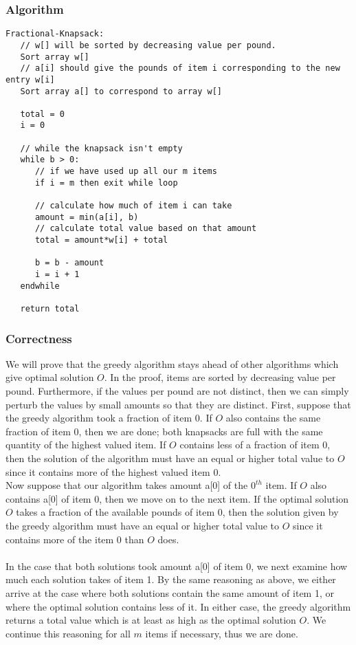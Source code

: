 \documentclass[12pt, oneside]{article}
\begin{document}
\subsubsection*{Algorithm}
\begin{verbatim}
Fractional-Knapsack:
   // w[] will be sorted by decreasing value per pound. 
   Sort array w[]
   // a[i] should give the pounds of item i corresponding to the new entry w[i] 
   Sort array a[] to correspond to array w[]
   
   total = 0
   i = 0
   
   // while the knapsack isn't empty
   while b > 0:
      // if we have used up all our m items
      if i = m then exit while loop
      
      // calculate how much of item i can take
      amount = min(a[i], b)
      // calculate total value based on that amount
      total = amount*w[i] + total
      
      b = b - amount
      i = i + 1
   endwhile
   
   return total
\end{verbatim}

\subsubsection*{Correctness}
We will prove that the greedy algorithm stays ahead of other algorithms which give optimal solution $O$. In the proof, items are sorted by decreasing value per pound. Furthermore, if the values per pound are not distinct, then we can simply perturb the values by small amounts so that they are distinct. First, suppose that the greedy algorithm took a fraction of item 0. If $O$ also contains the same fraction of item 0, then we are done; both knapsacks are full with the same quantity of the highest valued item. If $O$ contains less of a fraction of item 0, then the solution of the algorithm must have an equal or higher total value to $O$ since it contains more of the highest valued item 0. \\ 
Now suppose that our algorithm takes amount a[0] of the $0^{th}$ item. If $O$ also contains a[0] of item 0, then we move on to the next item. If the optimal solution $O$ takes a fraction of the available pounds of item 0, then the solution given by the greedy algorithm must have an equal or higher total value to $O$ since it contains more of the item 0 than $O$ does.\\\\
In the case that both solutions took amount a[0] of item 0, we next examine how much each solution takes of item 1. By the same reasoning as above, we either arrive at the case where both solutions contain the same amount of item 1, or where the optimal solution contains less of it. In either case, the greedy algorithm returns a total value which is at least as high as the optimal solution $O$. We continue this reasoning for all $m$ items if necessary, thus we are done.\\
\end{document}
